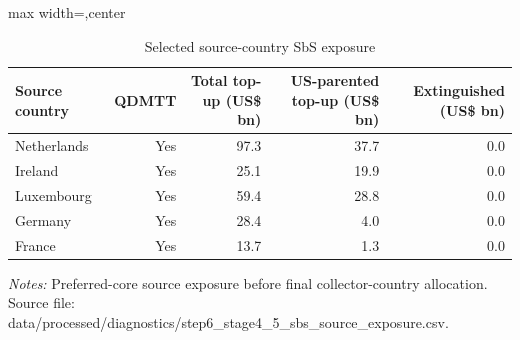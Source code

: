 \begin{table}[H]
\centering
\scriptsize
\caption{Selected source-country SbS exposure}
\label{tab:app_stage45_sbs_source_exposure}
\begin{adjustbox}{max width=\textwidth,center}
\begin{tabular}{@{}lrrrr@{}}
\toprule
Source country & QDMTT & Total top-up (US\$ bn) & US-parented top-up (US\$ bn) & Extinguished (US\$ bn) \\
\midrule
Netherlands & Yes & 97.3 & 37.7 & 0.0 \\
Ireland & Yes & 25.1 & 19.9 & 0.0 \\
Luxembourg & Yes & 59.4 & 28.8 & 0.0 \\
Germany & Yes & 28.4 &  4.0 & 0.0 \\
France & Yes & 13.7 &  1.3 & 0.0 \\
\bottomrule
\end{tabular}
\end{adjustbox}

\vspace{0.5em}
\begin{minipage}{0.96\textwidth}
\footnotesize\raggedright \textit{Notes:} Preferred-core source exposure before final collector-country allocation. Source file: data/processed/diagnostics/step6\_stage4\_5\_sbs\_source\_exposure.csv.
\end{minipage}
\end{table}
